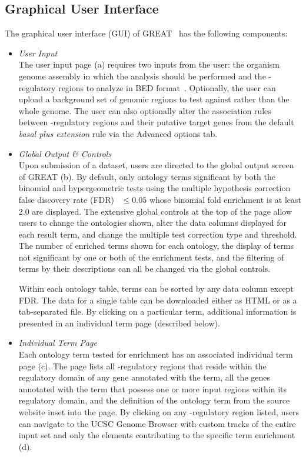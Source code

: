 \subsection*{Graphical User Interface}
\label{XGUI}
The graphical user interface (GUI) of GREAT \greatversion~has the following components: 
\begin{itemize}
\item \emph{User Input} \\
The user input page (a) requires two inputs from
the user: the organism genome assembly in which the analysis should be
performed and the \cis-regulatory regions to analyze in BED
format~\citep{Kent2002b}.
Optionally, the user can upload a background set of
genomic regions to test against rather than the whole genome.
The user can also optionally alter the association
rules between \cis-regulatory regions and their putative target genes from the default
\emph{basal plus extension} rule via the Advanced options tab.

\item \emph{Global Output \& Controls} \\
Upon submission of a dataset, users are directed to the global output screen
of GREAT (b).  By default, only ontology terms
significant by both the binomial and hypergeometric tests using the multiple
hypothesis correction false discovery rate (FDR)~\citep{Benjamini1995} $\leq 0.05$ whose binomial fold enrichment is at least
2.0 are displayed.  The extensive global controls at the top of the page
allow users to change the ontologies shown, alter the data columns displayed
for each result term, and change the multiple test correction type and
threshold.  The number of enriched terms shown for each ontology, the display
of terms not significant by one or both of the enrichment tests, and the
filtering of terms by their descriptions can all be changed via the global
controls.

Within each ontology table, terms can be sorted by any data column except
FDR.  The data for a single table can be downloaded either as HTML or as a
tab-separated file.  By clicking on a particular term, additional information
is presented in an individual term page (described below).

\item \emph{Individual Term Page} \\
Each ontology term tested for enrichment has an associated individual term
page (c).  The page lists all \cis-regulatory
regions that reside within the regulatory domain of any gene annotated with
the term, all the genes annotated with the term that possess one or more
input regions within its regulatory domain, and the definition of the
ontology term from the source website inset into the page.  By clicking on
any \cis-regulatory region listed, users can navigate to the UCSC Genome
Browser with custom tracks of the entire input set and only the elements
contributing to the specific term enrichment (d).


\end{itemize}
